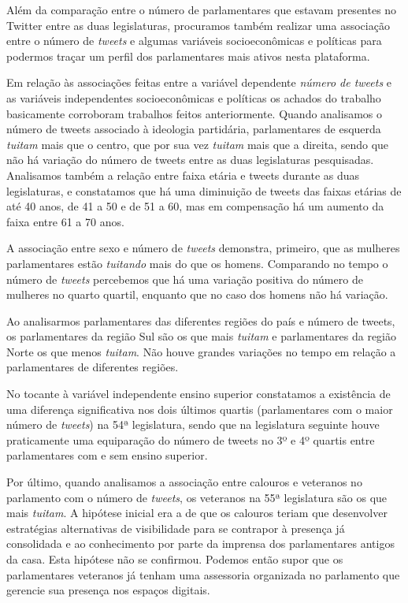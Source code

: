 Além da comparação entre o número de parlamentares que estavam presentes
no Twitter entre as duas legislaturas, procuramos também realizar uma
associação entre o número de \emph{tweets} e algumas variáveis
socioeconômicas e políticas para podermos traçar um perfil dos
parlamentares mais ativos nesta plataforma.

Em relação às associações feitas entre a variável dependente \textit{número de
tweets} e as variáveis independentes socioeconômicas e políticas os
achados do trabalho basicamente corroboram trabalhos feitos
anteriormente. Quando analisamos o número de tweets associado à
ideologia partidária, parlamentares de esquerda \emph{tuitam} mais que o
centro, que por sua vez \emph{tuitam} mais que a direita, sendo que não
há variação do número de tweets entre as duas legislaturas pesquisadas.
Analisamos também a relação entre faixa etária e tweets durante as duas
legislaturas, e constatamos que há uma diminuição de tweets das faixas
etárias de até 40 anos, de 41 a 50 e de 51 a 60, mas em compensação há
um aumento da faixa entre 61 a 70 anos.

A associação entre sexo e número de \emph{tweets} demonstra, primeiro,
que as mulheres parlamentares estão \emph{tuitando} mais do que os
homens. Comparando no tempo o número de \emph{tweets} percebemos que há
uma variação positiva do número de mulheres no quarto quartil, enquanto
que no caso dos homens não há variação.

Ao analisarmos parlamentares das diferentes regiões do país e número de
tweets, os parlamentares da região Sul são os que mais \emph{tuitam} e
parlamentares da região Norte os que menos \emph{tuitam}. Não houve
grandes variações no tempo em relação a parlamentares de diferentes
regiões.

No tocante à variável independente ensino superior constatamos a
existência de uma diferença significativa nos dois últimos quartis
(parlamentares com o maior número de \emph{tweets}) na 54ª legislatura,
sendo que na legislatura seguinte houve praticamente uma equiparação do
número de tweets no 3º e 4º quartis entre parlamentares com e sem ensino
superior.

Por último, quando analisamos a associação entre calouros e veteranos no
parlamento com o número de \emph{tweets}, os veteranos na 55ª
legislatura são os que mais \emph{tuitam}. A hipótese inicial era a de
que os calouros teriam que desenvolver estratégias alternativas de
visibilidade para se contrapor à presença já consolidada e ao
conhecimento por parte da imprensa dos parlamentares antigos da casa.
Esta hipótese não se confirmou. Podemos então supor que os parlamentares
veteranos já tenham uma assessoria organizada no parlamento que gerencie
sua presença nos espaços digitais.

